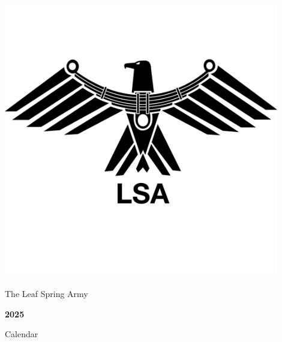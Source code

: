 \makeatother

\newcommand{\publishingdate}{December 2024}
\newcommand{\publishingversion}{PDF Version}
\newcommand{\isbn}{123-45-67890-12-8} %

\usepackage[ISBN=\isbn,SC0]{ean13isbn}




\newpage

\vfill

\begin{center}

\includegraphics[width=120mm]{photos/lsa-eagle-black.png}

\vspace{10mm}

{\Huge The Leaf Spring Army}

\vspace{10mm}

{\HUGE \textbf{2025}}

\vspace{10mm}

{\Huge Calendar}


\end{center}

